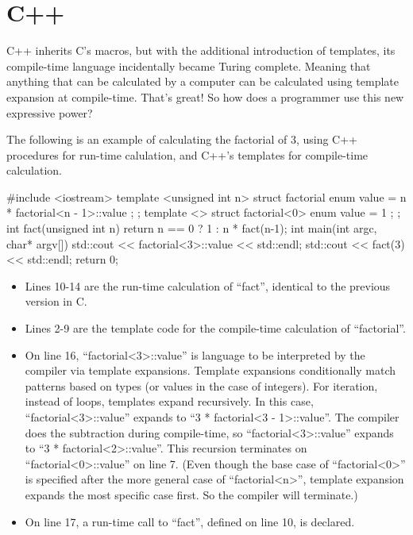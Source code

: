  \section{C++}

 C++ inherits C's macros, but with the additional introduction
 of templates, its compile-time language
 incidentally became Turing complete.  Meaning that
 anything that can be
 calculated by a computer can be calculated using template expansion
 at compile-time.  That's great!  So how does a programmer use this new
 expressive power?

 The following is an example of calculating the factorial of
 3, using C++ procedures for run-time calulation, and C++'s templates for compile-time
 calculation.

 \begin{code}
 #include <iostream>
 template <unsigned int n>
 struct factorial {
     enum { value = n * factorial<n - 1>::value };
 };
 template <>
 struct factorial<0> {
     enum { value = 1 };
 };
 int fact(unsigned int n){
   return n == 0
     ? 1
     : n * fact(n-1);
 }
 int main(int argc, char* argv[]){
   std::cout << factorial<3>::value << std::endl;
   std::cout << fact(3) << std::endl;
   return 0;
 }
 \end{code}

 \begin{itemize}
  \item
    Lines 10-14 are the run-time calculation of ``fact'', identical
    to the previous version in C.
  \item
   Lines 2-9 are the
   template code for the compile-time calculation of ``factorial''.
   \item
 On line 16, ``factorial\textless3\textgreater::value'' is
 language to be interpreted
 by the compiler via template expansions.  Template expansions
 conditionally match patterns based on types (or values in the case
 of integers).  For iteration, instead of loops, templates expand recursively.
 In this case,  ``factorial\textless3\textgreater::value'' expands to
 ``3 * factorial\textless3 - 1\textgreater::value''.  The compiler
 does the subtraction during compile-time,
 so ``factorial\textless3\textgreater::value'' expands to
 ``3 * factorial\textless2\textgreater::value''.
 This recursion terminates on ``factorial\textless0\textgreater::value''
 on line 7. (Even though
 the base case of ``factorial\textless0\textgreater'' is specified
 after the more general
 case of ``factorial\textless n\textgreater'', template expansion expands the most
 specific case first.  So the compiler will terminate.)

   \item
 On line 17, a run-time call to ``fact'', defined on line 10, is declared.
 \end{itemize}


